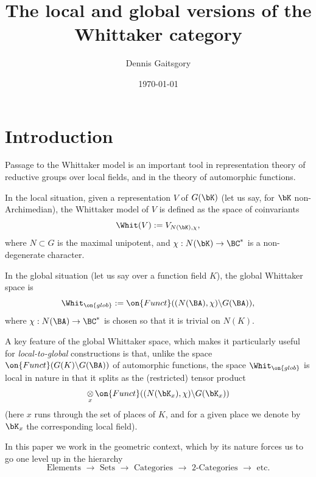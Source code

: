 \documentclass[9pt]{amsart}
\theoremstyle{definition}
\theoremstyle{remark}
\numberwithin{equation}{section}
\begin{document}
\author{Dennis Gaitsgory}

\title[The local and global versions of the Whittaker category]{The local and global versions of the Whittaker category}


\date{\today}

\maketitle

\tableofcontents

\section*{Introduction}


\sssec{}

Passage to the Whittaker model is an important tool in representation theory of reductive groups over local fields,
and in the theory of automorphic functions.

\medskip

In the local situation, given a representation $V$ of $G(\bK)$ (let us say, for $\bK$ non-Archimedian),
the Whittaker model of $V$ is defined as the space 
of coinvariants 
$$\Whit(V):=V_{N(\bK),\chi},$$
where $N\subset G$ is the maximal unipotent, and $\chi:N(\bK)\to \BC^*$ is a non-degenerate character.

\medskip

In the global situation (let us say over a function field $K$), the global Whittaker space is 
$$\Whit_{\on{glob}}:=\on{Funct}((N(\BA),\chi)\backslash G(\BA)),$$
where $\chi:N(\BA)\to \BC^*$ is chosen so that it is trivial on $N(K)$. 

\medskip

A key feature of the global Whittaker space, which makes it particularly useful for \emph{local-to-global} constructions is that, unlike 
the space $\on{Funct}(G(K)\backslash G(\BA))$ of automorphic functions, the space $\Whit_{\on{glob}}$ is local in nature in that it splits as the
(restricted) tensor product
$$\underset{x}\otimes\, \on{Funct}((N(\bK_x),\chi)\backslash G(\bK_x))$$
(here $x$ runs through the set of places of $K$, and for a given place we denote by $\bK_x$ the corresponding local field). 

\sssec{}

In this paper we work in the geometric context, which by its nature forces us to go one level up in the hierarchy
$$\text{Elements }\to \text{ Sets }\to \text{ Categories } \to \text{ 2-Categories }\to \text{ etc.}$$
\end{document}
